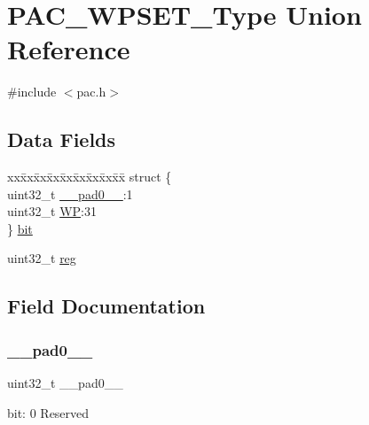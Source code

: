 \hypertarget{union_p_a_c___w_p_s_e_t___type}{}\section{P\+A\+C\+\_\+\+W\+P\+S\+E\+T\+\_\+\+Type Union Reference}
\label{union_p_a_c___w_p_s_e_t___type}


{\ttfamily \#include $<$pac.\+h$>$}

\subsection*{Data Fields}
\begin{DoxyCompactItemize}
\item 
\begin{tabbing}
xx\=xx\=xx\=xx\=xx\=xx\=xx\=xx\=xx\=\kill
struct \{\\
\>uint32\_t \mbox{\hyperlink{union_p_a_c___w_p_s_e_t___type_a3e57c2ef1c3ffb36722f000cc1156824}{\_\_pad0\_\_}}:1\\
\>uint32\_t \mbox{\hyperlink{union_p_a_c___w_p_s_e_t___type_a086f0495fbde459e38572b5adcfae92b}{WP}}:31\\
\} \mbox{\hyperlink{union_p_a_c___w_p_s_e_t___type_a0ab8e9036f25bf96f13639fbba44e13d}{bit}}\\

\end{tabbing}\item 
uint32\+\_\+t \mbox{\hyperlink{union_p_a_c___w_p_s_e_t___type_a6b91636401516a477989a336376d7b40}{reg}}
\end{DoxyCompactItemize}


\subsection{Field Documentation}
\mbox{\label{union_p_a_c___w_p_s_e_t___type_a3e57c2ef1c3ffb36722f000cc1156824}} 
\subsubsection{\texorpdfstring{\_\_pad0\_\_}{\_\_pad0\_\_}}
{\footnotesize\ttfamily uint32\+\_\+t \+\_\+\+\_\+pad0\+\_\+\+\_\+}

bit\+: 0 Reserved \mbox{\label{union_p_a_c___w_p_s_e_t___type_a0ab8e9036f25bf96f13639fbba44e13d}} 
